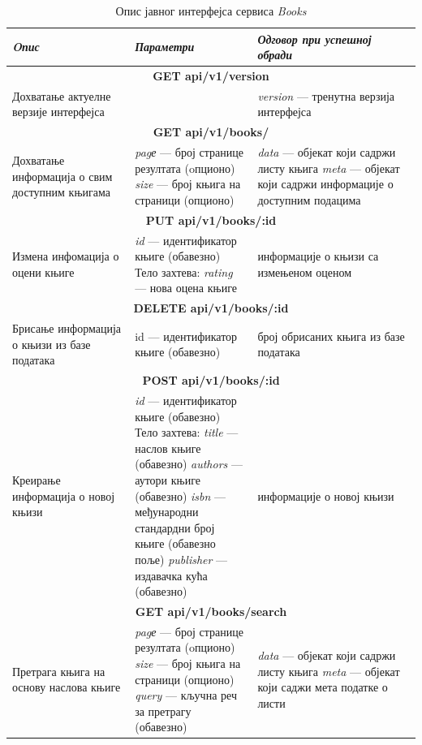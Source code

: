 \documentclass[12pt,oneside]{memoir}
\begin{document}
\begin{table}
\caption{Опис јавног интерфејса сервиса \textit{Books}}
\label{tbl:booksAPI}
\begin{tabular}{ |  p{0.3\linewidth} | p{0.3\linewidth}|  p{0.4\linewidth} | }
\hline
\textit{Oпис} & \textit{Параметри} & \textit{Одговор при успешној обради} \\
\hline
\multicolumn{3}{|c|}{\textbf{GET api/v1/version}} \\
\hline
Дохватање актуелне верзије интерфејса & & 
\textit{version} --- тренутна верзија интерфејса \\
\hline
\multicolumn{3}{|c|}{\textbf{GET api/v1/books/}} \\
\hline
Дохватање информација о свим доступним књигама & 
\textit{pagе} --- број странице резултата (oпционо) \newline 
\textit{size} --- број књига на страници (опционо)
& 
\textit{data} --- објекат који садржи листу књига \newline
\textit{meta} --- објекат који садржи информације о доступним подацима \\
\hline
\multicolumn{3}{|c|}{\textbf{PUT api/v1/books/:id}} \\
\hline
Измена инфомација о оцени књиге & 
\textit{id} --- идентификатор књиге (обавезно) \newline 
Тело захтева: \newline
\textit{rating} --- нова оцена књиге
& 
информације о књизи са измењеном оценом\\
\hline
\multicolumn{3}{|c|}{\textbf{DELETE api/v1/books/:id}} \\
\hline
Брисање информација о књизи из базе података & 
{id} --- идентификатор књиге (обавезно)
& 
број обрисаних књига из базе података \\
\hline
\multicolumn{3}{|c|}{\textbf{POST api/v1/books/:id}} \\
\hline
Креирање информација о новој књизи &
\textit{id} --- идентификатор књиге (обавезно) \newline 
Тело захтева:\newline
\textit{title}  --- наслов књиге (обавезно) \newline
\textit{authors} --- аутори књиге (обавезно)  \newline
\textit{isbn} --- међународни стандардни број књиге (обавезно поље) \newline
\textit{publisher} --- издавачка кућа (обавезно) 
& 
информације о новој књизи\\
\hline
\multicolumn{3}{|c|}{\textbf{GET api/v1/books/search}} \\
\hline
Претрага књига на основу наслова књиге &
\textit{pagе} --- број странице резултата (oпционо) \newline 
\textit{size} --- број књига на страници (опционо) \newline 
\textit{query} --- кључна реч за претрагу (обавезно) 
  & 
\textit{data} --- објекат који садржи листу књига \newline
\textit{meta} --- објекат који саджи мета податке о листи \\
\hline
\end{tabular}
\end{table}
\end{document}
